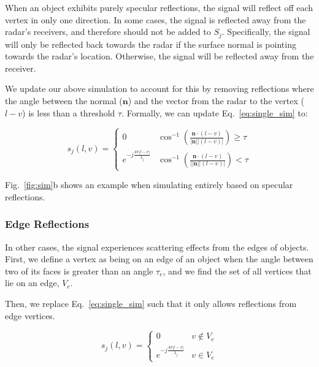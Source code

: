 When an object exhibits purely specular reflections, the signal will reflect off each vertex in only one direction. In some cases, the signal is reflected away from the radar's receivers, and therefore should not be added to $S_j$. Specifically, the signal will only be reflected back towards the radar if the surface normal is pointing towards the radar's location. Otherwise, the signal will be reflected away from the receiver.

We update our above simulation to account for this by removing reflections where the angle between the normal ($\boldsymbol{n}$) and the vector from the radar to the vertex ($l-v$) is less than a threshold $\tau$. Formally, we can update Eq.~\ref{eq:single_sim} to:


\vspace{-0.1pt}
{ \eqsize
\begin{equation}
    s_j(l,v) =  \begin{cases} 
      0 & \cos^{-1}(\frac{\boldsymbol{n} \cdot (l-v)}{|\boldsymbol{n}| |(l-v)|}) \geq \tau \\
      e^{-j \frac{4 \pi |l-v|}{\lambda_j}} & \cos^{-1}(\frac{\boldsymbol{n} \cdot (l-v)}{||\boldsymbol{n}| |(l-v)|}) < \tau
   \end{cases}
\end{equation}}

\noindent Fig.~\ref{fig:sim}b shows an example when simulating entirely based on specular reflections.

\vspace{-0.1pt}
\subsubsection{Edge Reflections}
\vspace{-0.1pt}

In other cases, the signal experiences scattering effects from the edges of objects.
First, we define a vertex as being on an edge of an object when the angle between two of its faces is greater than an angle $\tau_e$, and we find the set of all vertices that lie on an edge, $V_e$. 

Then, we replace Eq.~\ref{eq:single_sim} such that it only allows reflections from edge vertices.


\vspace{-0.1pt}
{ \eqsize
\begin{equation}
    s_j(l,v) =  \begin{cases} 
      0 & v \notin V_e \\
      e^{-j \frac{4 \pi |l-v|}{\lambda_j}} & v \in V_e
   \end{cases}
\end{equation}}

